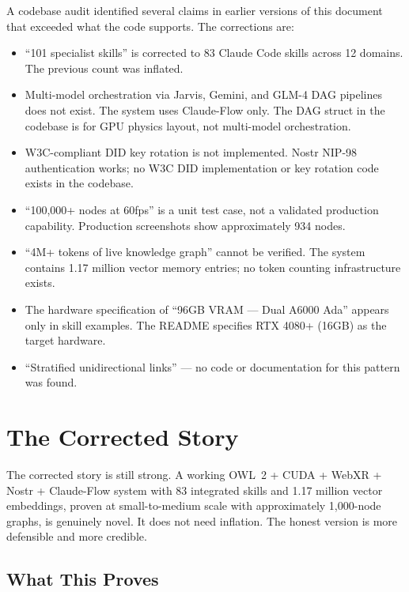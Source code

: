 \begin{cautionbox}[title={Corrected Claims}]
A codebase audit identified several claims in earlier versions of this document that exceeded what the code supports. The corrections are:
\begin{itemize}
  \item ``101 specialist skills'' is corrected to 83 Claude Code skills across 12 domains. The previous count was inflated.
  \item Multi-model orchestration via Jarvis, Gemini, and GLM-4 DAG pipelines does not exist. The system uses Claude-Flow only. The DAG struct in the codebase is for GPU physics layout, not multi-model orchestration.
  \item W3C-compliant DID key rotation is not implemented. Nostr NIP-98 authentication works; no W3C DID implementation or key rotation code exists in the codebase.
  \item ``100,000+ nodes at 60fps'' is a unit test case, not a validated production capability. Production screenshots show approximately 934 nodes.
  \item ``4M+ tokens of live knowledge graph'' cannot be verified. The system contains 1.17 million vector memory entries; no token counting infrastructure exists.
  \item The hardware specification of ``96GB VRAM --- Dual A6000 Ada'' appears only in skill examples. The README specifies RTX 4080+ (16GB) as the target hardware.
  \item ``Stratified unidirectional links'' --- no code or documentation for this pattern was found.
\end{itemize}
\end{cautionbox}

\section{The Corrected Story}

The corrected story is still strong. A working OWL~2 + CUDA + WebXR + Nostr + Claude-Flow system with 83 integrated skills and 1.17 million vector embeddings, proven at small-to-medium scale with approximately 1,000-node graphs, is genuinely novel. It does not need inflation. The honest version is more defensible and more credible.

\subsection{What This Proves}

